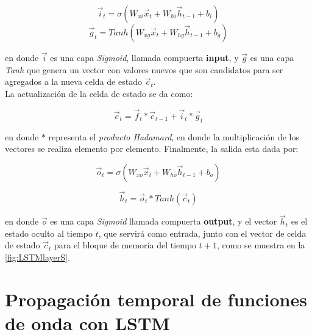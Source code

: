 \begin{equation}\label{eq:it}
\vec{i}_t = \sigma(W_{xi}\vec{x}_t + W_{hi}\vec{h}_{t-1} + b_i)
\end{equation}
\begin{equation}
  \label{eq:gt}
\vec{g}_t = Tanh(W_{xg}\vec{x}_t + W_{hg}\vec{h}_{t-1} + b_g)  
\end{equation}

en donde $\vec{i}$ es una capa \emph{Sigmoid}, llamada compuerta \textbf{input}, y $\vec{g}$ es una capa \emph{Tanh} que genera un vector con valores nuevos que son candidatos para ser agregados a la nueva celda de estado $\vec{c}_t$.
\\
La actualización de la celda de estado se da como:

\begin{equation}\label{eq:ct}
\vec{c}_t = \vec{f}_t \ast \vec{c}_{t-1} + \vec{i}_t \ast \vec{g}_t
\end{equation}

en donde $\ast$ representa el \emph{producto Hadamard}, en donde la multiplicación de los vectores se realiza elemento por elemento. Finalmente, la salida esta dada por:

\begin{equation}\label{eq:ot}
\vec{o}_t = \sigma(W_{xo}\vec{x}_t + W_{ho}\vec{h}_{t-1} + b_o)
\end{equation}

\begin{equation}\label{eq:ht}
\vec{h}_t = \vec{o}_t\ast Tanh(\vec{c}_t)
\end{equation}

en donde $\vec{o}$ es una capa \emph{Sigmoid} llamada compuerta \textbf{output}, y el vector $\vec{h}_t$ es el estado oculto al tiempo $t$, que servirá como entrada, junto con el vector de celda de estado $\vec{c}_t$ para el bloque de memoria del tiempo $t+1$, como se muestra en la \autoref{fig:LSTMlayerS}.


\section{Propagación temporal de funciones de onda con LSTM}\label{sec:Project}

